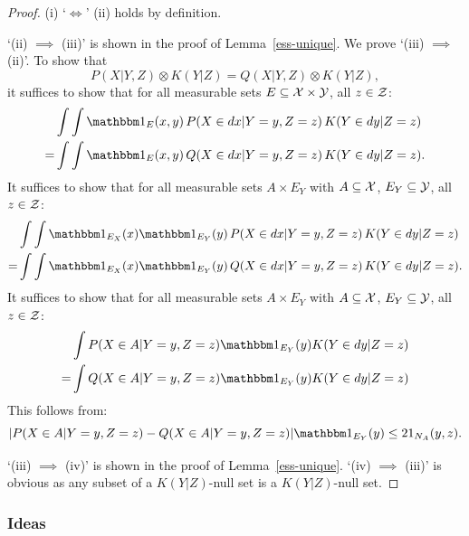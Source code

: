 \begin{proof}
  (i) `$\iff$' (ii) holds by definition.

  `(ii) $\implies$ (iii)' is shown in the proof of Lemma~\ref{ess-unique}.
  We prove `(iii) $\implies$ (ii)'.
  To show that 
    \[ P(X|Y,Z) \otimes K(Y|Z) = Q(X|Y,Z) \otimes K(Y|Z), \]
  it suffices to show that for all measurable sets $E \subseteq \mathcal{X} \times \mathcal{Y}$, all $z \in \mathcal{Z}$:
  \begin{equation*}\begin{split}
    & \int\int \I_E(x,y)\, P(X \in dx|Y=y,Z=z) \, K(Y \in dy|Z=z) \\
    = & \int\int \I_E(x,y)\, Q(X \in dx|Y=y,Z=z) \, K(Y \in dy|Z=z).
  \end{split}\end{equation*}
  It suffices to show that for all measurable sets $A \times E_Y$ with $A \subseteq \mathcal{X}$, $E_Y \subseteq \mathcal{Y}$, all $z \in \mathcal{Z}$:
  \begin{equation*}\begin{split}
    & \int\int \I_{E_X}(x) \I_{E_Y}(y)\, P(X \in dx|Y=y,Z=z) \, K(Y \in dy|Z=z) \\
    = & \int\int \I_{E_X}(x) \I_{E_Y}(y)\, Q(X \in dx|Y=y,Z=z) \, K(Y \in dy|Z=z).
  \end{split}\end{equation*}
  It suffices to show that for all measurable sets $A \times E_Y$ with $A \subseteq \mathcal{X}$, $E_Y \subseteq \mathcal{Y}$, all $z \in \mathcal{Z}$:
  \begin{equation*}\begin{split}
    & \int P(X \in A|Y=y,Z=z) \I_{E_Y}(y) K(Y \in dy|Z=z) \\
    = & \int Q(X \in A|Y=y,Z=z) \I_{E_Y}(y) K(Y \in dy|Z=z)
  \end{split}\end{equation*}
  This follows from:
  $$|P(X \in A|Y=y,Z=z) - Q(X \in A|Y=y,Z=z)| \I_{E_Y}(y) \le 2 1_{N_A}(y,z).$$
  
  `(iii) $\implies$ (iv)' is shown in the proof of Lemma~\ref{ess-unique}.
  `(iv) $\implies$ (iii)' is obvious as any subset of a $K(Y|Z)$-null set is a $K(Y|Z)$-null set.
\end{proof}

\subsubsection{Ideas}


